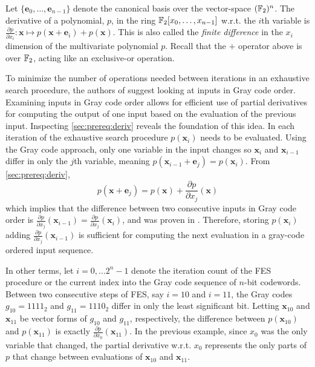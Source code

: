 \begin{defn}[Derivatives] \label{sec:prereq:deriv}
    Let $\{\mathbf{e}_0, \dots, \mathbf{e}_{n-1}\}$ denote the canonical basis over the vector-space $(\mathbb{F}_2)^n$. The derivative of a polynomial, $p$, in the ring $\mathbb{F}_2[x_0,\dots,x_{n-1}]$ w.r.t. the $i$th variable is $\frac{\partial p}{\partial x_i} : \mathbf{x} \mapsto p(\mathbf{x} + \mathbf{e}_i) + p(\mathbf{x})$. This is also called the \textit{finite difference} in the $x_i$ dimension of the multivariate polynomial $p$. Recall that the $+$ operator above is over $\mathbb{F}_2$, acting like an exclusive-or operation.
\end{defn} 

To minimize the number of operations needed between iterations in an exhaustive search procedure, the authors of \cite{ches-2010-23990} suggest looking at inputs in Gray code order.
Examining inputs in Gray code order allows for efficient use of partial derivatives for computing the output of one input based on the evaluation of the previous input. Inspecting \cref{sec:prereq:deriv} reveals the foundation of this idea. In each iteration of the exhaustive search procedure $p(\mathbf{x}_i)$ needs to be evaluated. Using the Gray code approach, only one variable in the input changes so $\mathbf{x}_i$ and $\mathbf{x}_{i - 1}$ differ in only the $j$th variable, meaning $p(\mathbf{x}_{i - 1} + \mathbf{e}_j) = p(\mathbf{x}_i)$. From \cref{sec:prereq:deriv}, $$
    p(\mathbf{x} + \mathbf{e}_j) = p(\mathbf{x}) + \frac{\partial p}{\partial x_j}(\mathbf{x})
$$ 
which implies that the difference between two consecutive inputs in Gray code order is $\frac{\partial p}{\partial x_j}(\mathbf{x}_{i - 1}) = \frac{\partial p}{\partial x_j}(\mathbf{x}_i)$, and was proven in \cite{tungchoumasters}. Therefore, storing $p(\mathbf{x}_i)$ adding $\frac{\partial p}{\partial x_j}(\mathbf{x}_{i-1})$ is sufficient for computing the next evaluation in a gray-code ordered input sequence.

In other terms, let $i = 0,\dots 2^n-1$ denote the iteration count of the FES procedure or the current index into the Gray code sequence of $n$-bit codewords. Between two consecutive steps of FES, say $i = 10$ and $i = 11$, the Gray codes $g_{10} = 1111_2$ and $g_{11} = 1110_2$ differ in only the least significant bit. Letting $\mathbf{x}_{10}$ and $\mathbf{x}_{11}$ be vector forms of $g_{10}$ and $g_{11}$, respectively, the difference between $p(\mathbf{x}_{10})$ and $p(\mathbf{x}_{11})$ is exactly $\frac{\partial p}{\partial x_0}(\mathbf{x}_{11})$. In the previous example, since $x_0$ was the only variable that changed, the partial derivative w.r.t. $x_0$ represents the only parts of $p$ that change between evaluations of $\mathbf{x}_{10}$ and $\mathbf{x}_{11}$.

